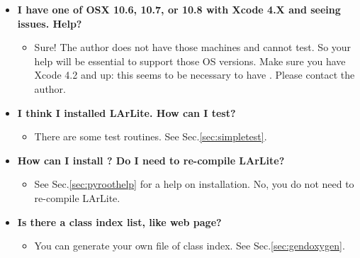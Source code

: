 \begin{itemize}
\item[] {\bf I have one of OSX 10.6, 10.7, or 10.8 with Xcode 4.X and seeing issues. Help?}
  \begin{itemize}
    \item Sure! The author does not have those machines and cannot test. So your
      help will be essential to support those OS versions. Make sure you have Xcode 4.2
      and up: this seems to be necessary to have \clang. Please contact the author.
  \end{itemize}

\item[] {\bf I think I installed LArLite. How can I test?}
  \begin{itemize}
    \item There are some test routines. See Sec.\ref{sec:simpletest}.
  \end{itemize}

\item[] {\bf How can I install \PyROOT? Do I need to re-compile LArLite?}
  \begin{itemize}
    \item See Sec.\ref{sec:pyroothelp} for a help on installation. No, you do not need to re-compile LArLite.
  \end{itemize}

\item[] {\bf Is there a class index list, like \ROOT web page?}
  \begin{itemize}
    \item You can generate your own \HTML file of class index. See Sec.\ref{sec:gendoxygen}.
  \end{itemize}

\end{itemize}



